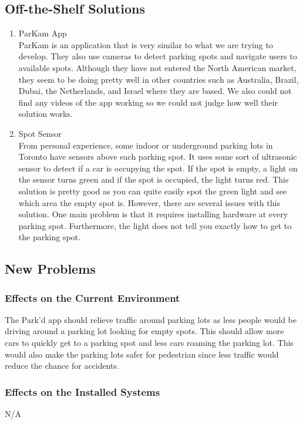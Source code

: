 \documentclass[12pt,letterpaper]{article}
\begin{document}
\subsection{Off-the-Shelf Solutions}
\begin{enumerate}
    \item ParKam App\\
    ParKam is an application that is very similar to what we are trying to
    develop. They also use cameras to detect parking spots and navigate users to
    available spots. Although they have not entered the North American market,
    they seem to be doing pretty well in other countries such as Australia,
    Brazil, Dubai, the Netherlands, and Israel where they are based. We also
    could not find any videos of the app working so we could not judge how well
    their solution works.
    
    \item Spot Sensor\\
    From personal experience, some indoor or underground parking lots in Toronto
    have sensors above each parking spot. It uses some sort of ultrasonic sensor
    to detect if a car is occupying the spot. If the spot is empty, a light on
    the sensor turns green and if the spot is occupied, the light turns red.
    This solution is pretty good as you can quite easily spot the green light
    and see which area the empty spot is. However, there are several issues with
    this solution. One main problem is that it requires installing hardware at
    every parking spot. Furthermore, the light does not tell you exactly how to
    get to the parking spot.
\end{enumerate}

\subsection{New Problems}
\subsubsection{Effects on the Current Environment}
The Park'd app should relieve traffic around parking lots as less people would
be driving around a parking lot looking for empty spots. This should allow more
cars to quickly get to a parking spot and less cars roaming the parking lot.
This would also make the parking lots safer for pedestrian since less traffic
would reduce the chance for accidents.

\subsubsection{Effects on the Installed Systems}
N/A
\end{document}
